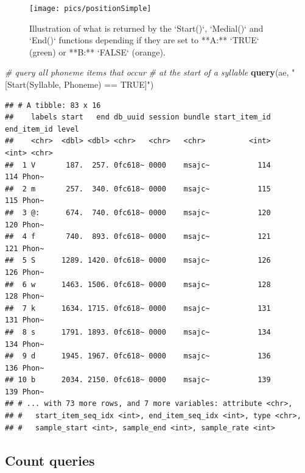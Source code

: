 \documentclass[]{book}
\newenvironment{Shaded}{\begin{snugshade}}{\end{snugshade}}
\newcommand{\CommentTok}[1]{\textcolor[rgb]{0.56,0.35,0.01}{\textit{#1}}}
\newcommand{\KeywordTok}[1]{\textcolor[rgb]{0.13,0.29,0.53}{\textbf{#1}}}
\newcommand{\NormalTok}[1]{#1}
\newcommand{\StringTok}[1]{\textcolor[rgb]{0.31,0.60,0.02}{#1}}
\begin{document}
\begin{figure}

{\centering \texttt{[image: pics/positionSimple]} 

}

\caption{Illustration of what is returned by the `Start()`, `Medial()` and `End()` functions depending if they are set to **A:** `TRUE` (green) or **B:** `FALSE` (orange).}\label{fig:query-positionSimple}
\end{figure}

\begin{Shaded}
\begin{Highlighting}[]
\CommentTok{# query all phoneme items that occur}
\CommentTok{# at the start of a syllable}
\KeywordTok{query}\NormalTok{(ae, }\StringTok{"[Start(Syllable, Phoneme) == TRUE]"}\NormalTok{)}
\end{Highlighting}
\end{Shaded}

\begin{verbatim}
## # A tibble: 83 x 16
##    labels start   end db_uuid session bundle start_item_id end_item_id level
##    <chr>  <dbl> <dbl> <chr>   <chr>   <chr>          <int>       <int> <chr>
##  1 V       187.  257. 0fc618~ 0000    msajc~           114         114 Phon~
##  2 m       257.  340. 0fc618~ 0000    msajc~           115         115 Phon~
##  3 @:      674.  740. 0fc618~ 0000    msajc~           120         120 Phon~
##  4 f       740.  893. 0fc618~ 0000    msajc~           121         121 Phon~
##  5 S      1289. 1420. 0fc618~ 0000    msajc~           126         126 Phon~
##  6 w      1463. 1506. 0fc618~ 0000    msajc~           128         128 Phon~
##  7 k      1634. 1715. 0fc618~ 0000    msajc~           131         131 Phon~
##  8 s      1791. 1893. 0fc618~ 0000    msajc~           134         134 Phon~
##  9 d      1945. 1967. 0fc618~ 0000    msajc~           136         136 Phon~
## 10 b      2034. 2150. 0fc618~ 0000    msajc~           139         139 Phon~
## # ... with 73 more rows, and 7 more variables: attribute <chr>,
## #   start_item_seq_idx <int>, end_item_seq_idx <int>, type <chr>,
## #   sample_start <int>, sample_end <int>, sample_rate <int>
\end{verbatim}

\hypertarget{subsec:query-countQueries}{%
\subsection{Count queries}\label{subsec:query-countQueries}}
\end{document}
